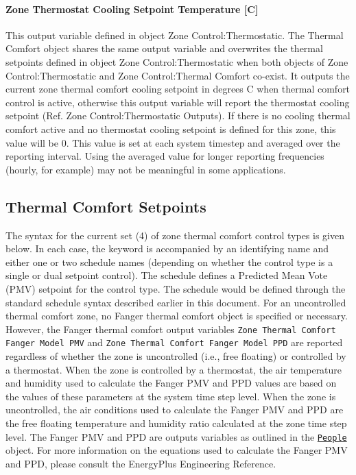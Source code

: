 \paragraph{Zone Thermostat Cooling Setpoint Temperature {[}C{]}}\label{zone-thermostat-cooling-setpoint-temperature-c-1}

This output variable defined in object Zone Control:Thermostatic. The Thermal Comfort object shares the same output variable and overwrites the thermal setpoints defined in object Zone Control:Thermostatic when both objects of Zone Control:Thermostatic and Zone Control:Thermal Comfort co-exist. It outputs the current zone thermal comfort cooling setpoint in degrees C when thermal comfort control is active, otherwise this output variable will report the thermostat cooling setpoint (Ref. Zone Control:Thermostatic Outputs). If there is no cooling thermal comfort active and no thermostat cooling setpoint is defined for this zone, this value will be 0. This value is set at each system timestep and averaged over the reporting interval. Using the averaged value for longer reporting frequencies (hourly, for example) may not be meaningful in some applications.

\subsection{Thermal Comfort Setpoints}\label{thermal-comfort-setpoints}

The syntax for the current set (4) of zone thermal comfort control types is given below. In each case, the keyword is accompanied by an identifying name and either one or two schedule names (depending on whether the control type is a single or dual setpoint control). The schedule defines a Predicted Mean Vote (PMV) setpoint for the control type. The schedule would be defined through the standard schedule syntax described earlier in this document. For an uncontrolled thermal comfort zone, no Fanger thermal comfort object is specified or necessary. However, the Fanger thermal comfort output variables \lstinline!Zone Thermal Comfort Fanger Model PMV! and \lstinline!Zone Thermal Comfort Fanger Model PPD! are reported regardless of whether the zone is uncontrolled (i.e., free floating) or controlled by a thermostat. When the zone is controlled by a thermostat, the air temperature and humidity used to calculate the Fanger PMV and PPD values are based on the values of these parameters at the system time step level.  When the zone is uncontrolled, the air conditions used to calculate the Fanger PMV and PPD are the free floating temperature and humidity ratio calculated at the zone time step level. The Fanger PMV and PPD are outputs variables as outlined in the \hyperref[people]{\lstinline!People!} object. For more information on the equations used to calculate the Fanger PMV and PPD, please consult the EnergyPlus Engineering Reference.

